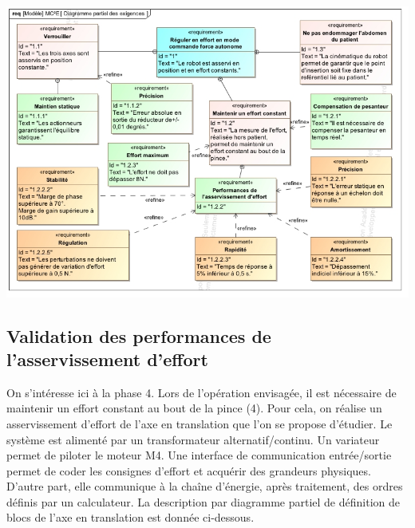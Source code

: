 \documentclass[10pt,fleqn]{article} %
\begin{document}
\begin{center}
\includegraphics[width=\linewidth]{images/Sujet/images/fig_05}
\end{center}


\subsection{Validation des performances de l’asservissement d’effort}
On s’intéresse ici à la phase 4. Lors de l’opération envisagée, il est nécessaire de maintenir un effort
constant au bout de la pince (4). Pour cela, on réalise un asservissement d’effort de l’axe en translation que
l’on se propose d’étudier.
Le système est alimenté par un transformateur alternatif/continu. Un variateur permet de piloter le moteur
M4. Une interface de communication entrée/sortie permet de coder les consignes d’effort et acquérir des
grandeurs physiques. D’autre part, elle communique à la chaîne d’énergie, après traitement, des ordres
définis par un calculateur.
La description par diagramme partiel de définition de blocs de l’axe en translation est donnée ci-dessous. %
\end{document}
